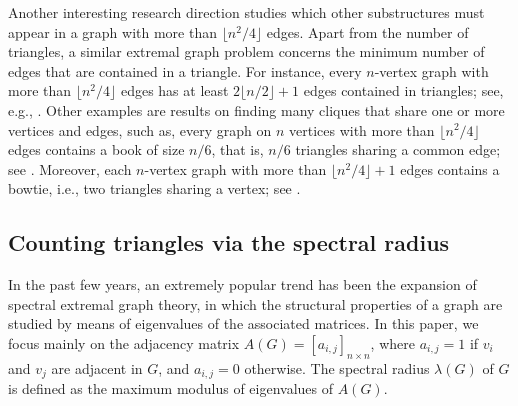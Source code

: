 \documentclass[11pt]{article}
\begin{document}
\medskip 
Another interesting research direction 
studies which other substructures 
must appear in a graph with more than $\lfloor n^2/4\rfloor $ edges.  
Apart from the number of triangles, 
 a similar extremal graph problem concerns the minimum 
 number of edges that 
are contained in a triangle. 
For instance, every $n$-vertex graph with more than 
 $ \lfloor {n^2}/{4} \rfloor$ edges has 
 at least $2\lfloor n/2\rfloor +1$ edges contained in triangles;  see, e.g.,  
\cite{EFR1992,FM2017,GL2018}. 
Other examples are results on finding many cliques 
that share one or more vertices and edges, 
such as,  
every graph on $n$ vertices with more than 
 $ \lfloor {n^2}/{4} \rfloor$ edges contains a book of size 
 $n/6$, that is,  $n/6$ 
 triangles sharing a common edge; see \cite{BN2005,BN2011,CFS2020-Siam}. 
 Moreover,  each $n$-vertex graph with more than $ \lfloor {n^2}/{4} \rfloor +1$ edges contains a bowtie, i.e., 
 two triangles sharing a vertex; 
see \cite{Erdos95, Chen03,KMP2020}. 


\subsection{Counting triangles via the spectral radius}


In the past few years, 
an extremely popular trend has been the expansion of 
spectral extremal graph theory, in which the structural properties of a graph are studied by means of eigenvalues of the associated matrices.  
In this paper, we focus mainly on 
the adjacency matrix $A(G)=[a_{i,j}]_{n \times n}$, 
where $a_{i,j}=1$ if $v_i$ and $v_j$ are adjacent in $G$, 
and $a_{i,j}=0$ otherwise. 
The spectral radius $\lambda (G)$ of $G$
 is defined as the maximum modulus 
of eigenvalues of $A(G)$. 
\end{document}
